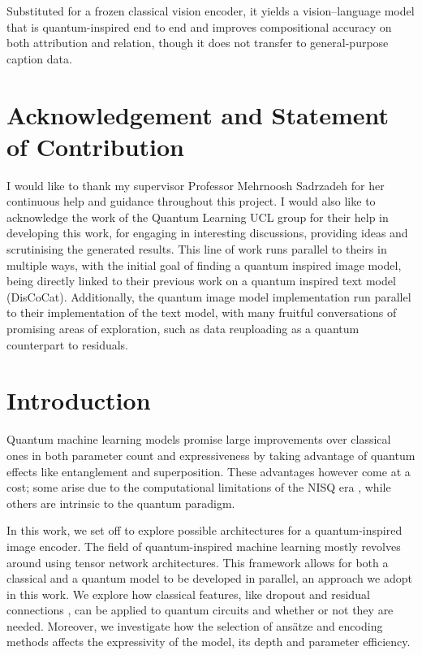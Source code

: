 \documentclass[12pt, a4paper, oneside]{report}
\begin{document}
Substituted for a frozen classical vision encoder, it yields a vision--language model that is quantum-inspired end to end and improves compositional accuracy on both attribution and relation, though it does not transfer to general-purpose caption data.

\newpage

\tableofcontents
\newpage

\chapter*{Acknowledgement and Statement of Contribution}

I would like to thank my supervisor Professor Mehrnoosh Sadrzadeh for her continuous help and guidance throughout this  project. I would also like to acknowledge the work of the Quantum Learning UCL group for their help in developing this work, for engaging in interesting discussions, providing ideas and scrutinising the generated results.
This line of work runs parallel to theirs in multiple ways, with the initial goal of finding a quantum inspired image model, being directly linked to their previous work on a quantum inspired text model (DisCoCat). Additionally, the quantum image model implementation run parallel to their implementation of the text model, with many fruitful conversations of promising areas of exploration, such as data reuploading as a quantum counterpart to residuals.



\newpage

\setcounter{page}{1}

\chapter{Introduction}


Quantum machine learning models promise large improvements over classical ones in both parameter count and expressiveness by taking advantage of quantum effects like entanglement and superposition. These advantages however come at a cost; some arise due to the computational limitations of the NISQ era \cite{nisq}, while others are intrinsic to the quantum paradigm.

In this work, we set off to explore possible architectures for a quantum-inspired image encoder. The field of quantum-inspired machine learning \cite{quantum_inspired} mostly revolves around using tensor network architectures. This framework allows for both a classical and a quantum model to be developed in parallel, an approach we adopt in this work. We explore how classical features, like dropout \cite{dropout} and residual connections \cite{residuals}, can be applied to quantum circuits and whether or not they are needed. Moreover, we investigate how the selection of ansätze and encoding methods affects the expressivity of the model, its depth and parameter efficiency.
\end{document}
